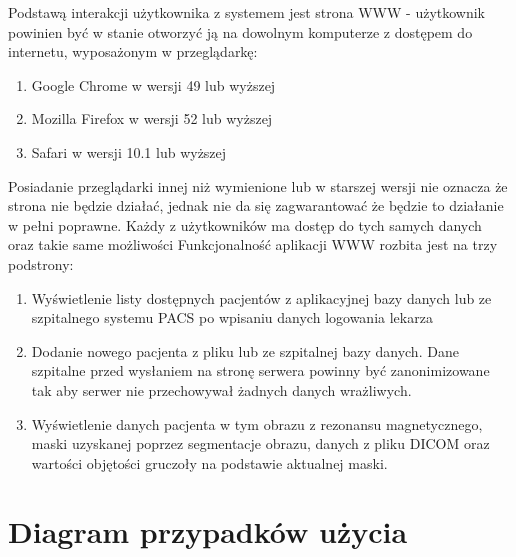 \documentclass[a4paper,11pt,twoside]{report}
\theoremstyle{definition}
\begin{document}
Podstawą interakcji użytkownika z systemem jest strona WWW - użytkownik powinien
być w stanie otworzyć ją na dowolnym komputerze z dostępem do internetu, wyposażonym
w przeglądarkę:
\begin {enumerate}
\item Google Chrome w wersji 49 lub wyższej
\item Mozilla Firefox w wersji 52 lub wyższej
\item Safari w wersji 10.1 lub wyższej
\end {enumerate}
Posiadanie przeglądarki innej niż wymienione lub w starszej wersji nie oznacza że strona nie będzie działać, jednak nie da się zagwarantować że będzie to działanie w pełni poprawne.
Każdy z użytkowników ma dostęp do tych samych danych oraz takie same możliwości
Funkcjonalność aplikacji WWW rozbita jest na trzy podstrony:
\begin {enumerate}
\item Wyświetlenie listy dostępnych pacjentów z aplikacyjnej bazy danych lub ze szpitalnego systemu PACS po wpisaniu danych logowania lekarza
\item Dodanie nowego pacjenta z pliku lub ze szpitalnej bazy danych. Dane szpitalne przed wysłaniem na stronę serwera powinny być zanonimizowane tak aby serwer nie przechowywał żadnych danych wrażliwych.
\item Wyświetlenie danych pacjenta w tym obrazu z rezonansu magnetycznego, maski uzyskanej poprzez segmentacje obrazu, danych z pliku DICOM oraz wartości objętości gruczoły na podstawie aktualnej maski.
\end {enumerate}

\section{Diagram przypadków użycia}
\end{document}
